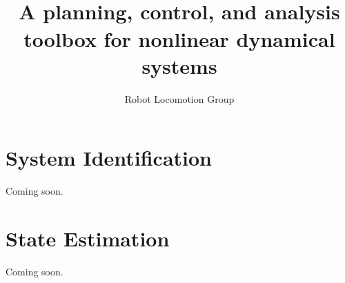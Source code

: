 \documentclass{book}
\title{{\Huge \drake}\\ {\huge A planning, control, and
    analysis toolbox for nonlinear dynamical systems}}
\author{\Large Robot Locomotion Group}
\begin{document}
\maketitle

\tableofcontents 













\chapter{System Identification}

Coming soon.

\chapter{State Estimation}

Coming soon.






\appendix






\end{document}
